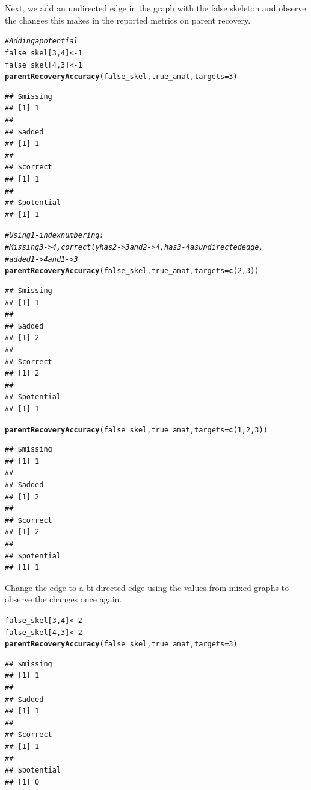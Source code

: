 \documentclass[12pt]{article}\usepackage[]{graphicx}\usepackage[]{xcolor}
\makeatletter
\newcommand{\hlnum}[1]{\textcolor[rgb]{0.686,0.059,0.569}{#1}}%
\newcommand{\hlcom}[1]{\textcolor[rgb]{0.678,0.584,0.686}{\textit{#1}}}%
\newcommand{\hlstd}[1]{\textcolor[rgb]{0.345,0.345,0.345}{#1}}%
\newcommand{\hlkwb}[1]{\textcolor[rgb]{0.69,0.353,0.396}{#1}}%
\newcommand{\hlkwc}[1]{\textcolor[rgb]{0.333,0.667,0.333}{#1}}%
\newcommand{\hlkwd}[1]{\textcolor[rgb]{0.737,0.353,0.396}{\textbf{#1}}}%
\newenvironment{kframe}{%
 \def\at@end@of@kframe{}%
 \ifinner\ifhmode%
  \def\at@end@of@kframe{\end{minipage}}%
  \begin{minipage}{\columnwidth}%
 \fi\fi%
 \def\FrameCommand##1{\hskip\@totalleftmargin \hskip-\fboxsep
 \colorbox{shadecolor}{##1}\hskip-\fboxsep
     \hskip-\linewidth \hskip-\@totalleftmargin \hskip\columnwidth}%
 \MakeFramed {\advance\hsize-\width
   \@totalleftmargin\z@ \linewidth\hsize
   \@setminipage}}%
 {\par\unskip\endMakeFramed%
 \at@end@of@kframe}
\newenvironment{knitrout}{}{} %
\makeatother
\begin{document}
Next, we add an undirected edge in the graph with the false skeleton and observe the changes this makes in the reported metrics on parent recovery.
\begin{knitrout}
\color{fgcolor}\begin{kframe}
\begin{alltt}
\hlcom{# Adding a potential}
\hlstd{false_skel[}\hlnum{3}\hlstd{,}\hlnum{4}\hlstd{]} \hlkwb{<-} \hlnum{1}
\hlstd{false_skel[}\hlnum{4}\hlstd{,}\hlnum{3}\hlstd{]} \hlkwb{<-} \hlnum{1}
\hlkwd{parentRecoveryAccuracy}\hlstd{(false_skel,true_amat,}\hlkwc{targets} \hlstd{=} \hlnum{3}\hlstd{)}
\end{alltt}
\begin{verbatim}
## $missing
## [1] 1
## 
## $added
## [1] 1
## 
## $correct
## [1] 1
## 
## $potential
## [1] 1
\end{verbatim}
\begin{alltt}
\hlcom{# Using 1-index numbering: }
\hlcom{# Missing 3 -> 4, correctly has 2->3 and 2->4, has 3-4 as undirected edge, }
\hlcom{# added 1->4 and 1->3}
\hlkwd{parentRecoveryAccuracy}\hlstd{(false_skel,true_amat,}\hlkwc{targets} \hlstd{=} \hlkwd{c}\hlstd{(}\hlnum{2}\hlstd{,}\hlnum{3}\hlstd{))}
\end{alltt}
\begin{verbatim}
## $missing
## [1] 1
## 
## $added
## [1] 2
## 
## $correct
## [1] 2
## 
## $potential
## [1] 1
\end{verbatim}
\begin{alltt}
\hlkwd{parentRecoveryAccuracy}\hlstd{(false_skel,true_amat,}\hlkwc{targets} \hlstd{=} \hlkwd{c}\hlstd{(}\hlnum{1}\hlstd{,}\hlnum{2}\hlstd{,}\hlnum{3}\hlstd{))}
\end{alltt}
\begin{verbatim}
## $missing
## [1] 1
## 
## $added
## [1] 2
## 
## $correct
## [1] 2
## 
## $potential
## [1] 1
\end{verbatim}
\end{kframe}
\end{knitrout}

Change the edge to a bi-directed edge using the values from mixed graphs to observe the changes once again.
\begin{knitrout}
\color{fgcolor}\begin{kframe}
\begin{alltt}
\hlstd{false_skel[}\hlnum{3}\hlstd{,}\hlnum{4}\hlstd{]} \hlkwb{<-} \hlnum{2}
\hlstd{false_skel[}\hlnum{4}\hlstd{,}\hlnum{3}\hlstd{]} \hlkwb{<-} \hlnum{2}
\hlkwd{parentRecoveryAccuracy}\hlstd{(false_skel,true_amat,}\hlkwc{targets} \hlstd{=} \hlnum{3}\hlstd{)}
\end{alltt}
\begin{verbatim}
## $missing
## [1] 1
## 
## $added
## [1] 1
## 
## $correct
## [1] 1
## 
## $potential
## [1] 0
\end{verbatim}
\end{kframe}
\end{knitrout}
\end{document}

